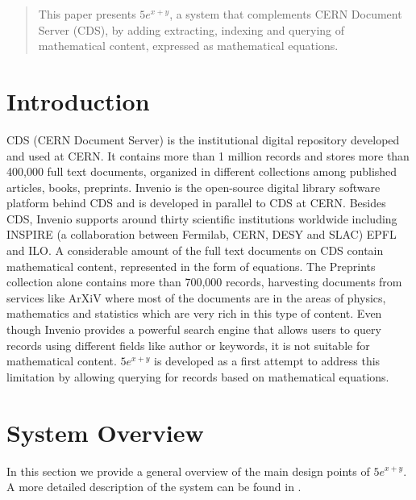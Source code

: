\documentclass{sig-alternate}
\begin{document}
\maketitle
\begin{abstract}
This paper presents $5e^{x+y}$, a system that complements CERN Document Server (CDS), by adding extracting, indexing and querying of mathematical content, expressed as mathematical equations.
\end{abstract}




\section{Introduction}
CDS\cite{CDS1} (CERN Document Server) is the institutional digital repository
developed and used at CERN\cite{CERN}. It contains more than 1 million records and stores more than 400,000 full text documents, organized in different collections among published articles, books, preprints. Invenio\cite{invenio} is the open-source digital library software platform behind CDS and is developed in parallel to CDS at CERN. Besides CDS, Invenio supports around thirty scientific institutions worldwide including INSPIRE (a collaboration between Fermilab, CERN, DESY and SLAC) EPFL and ILO. 
A considerable amount of the full text documents on CDS contain mathematical content, represented in the form of equations. The Preprints collection alone contains more than 700,000 records, harvesting documents from services like ArXiV\cite{arxiv} where most of the documents are in the areas of physics, mathematics and statistics which are very rich in this type of content. Even though Invenio provides a powerful search engine that allows users to query records using different fields like author or keywords, it is not suitable for mathematical content. $5e^{x+y}$ is developed as a first attempt to address this limitation by allowing querying for records based on mathematical equations.

\section{System Overview}
In this section we provide a general overview of the main design points of $5e^{x+y}$. A more detailed description of the system can be found in \cite{mathexplorerweb}.
\end{document}
